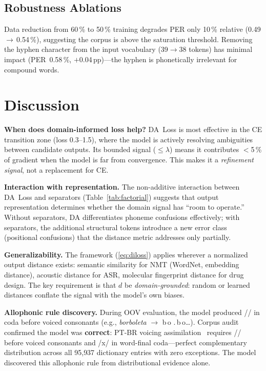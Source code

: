 \documentclass[conference]{IEEEtran}
\newcommand{\lam}{\lambda}                %
\begin{document}
\subsection{Robustness Ablations}

Data reduction from 60\,\% to 50\,\% training degrades PER only
10\,\% relative (0.49\,$\to$\,0.54\,\%), suggesting the corpus is
above the saturation threshold.
Removing the hyphen character from the input vocabulary
(39$\to$38 tokens) has minimal impact (PER~0.58\,\%,
$+$0.04\,pp)---the hyphen is phonetically irrelevant for compound
words.

\section{Discussion}
\label{sec:discussion}

\textbf{When does domain-informed loss help?}
DA~Loss is most effective in the CE transition zone
(loss 0.3--1.5), where the model is actively resolving ambiguities
between candidate outputs.
Its bounded signal ($\leq \lam$) means it contributes $<$5\,\% of
gradient when the model is far from convergence.
This makes it a \emph{refinement signal}, not a replacement for CE.

\textbf{Interaction with representation.}
The non-additive interaction between DA~Loss and separators
(Table~\ref{tab:factorial}) suggests that output representation
determines whether the domain signal has ``room to operate.''
Without separators, DA differentiates phoneme confusions
effectively; with separators, the additional structural tokens
introduce a new error class (positional confusions) that the
distance metric addresses only partially.

\textbf{Generalizability.}
The framework (\ref{eq:diloss}) applies wherever a normalized
output distance exists: semantic similarity for NMT (WordNet,
embedding distance), acoustic distance for ASR, molecular
fingerprint distance for drug design.
The key requirement is that $d$ be \emph{domain-grounded}: random
or learned distances conflate the signal with the model's own
biases.

\textbf{Allophonic rule discovery.}
During OOV evaluation, the model produced // in coda
before voiced consonants (e.g., \textit{borboleta} $\to$
b\,o\,\,.\,b\,o\ldots).
Corpus audit confirmed the model was \textbf{correct}:
PT-BR voicing assimilation~\cite{barbosa2004brazilian} requires
// before voiced consonants and /x/ in word-final
coda---perfect complementary distribution across all 95{,}937
dictionary entries with zero exceptions.
The model discovered this allophonic rule from distributional
evidence alone.
\end{document}
